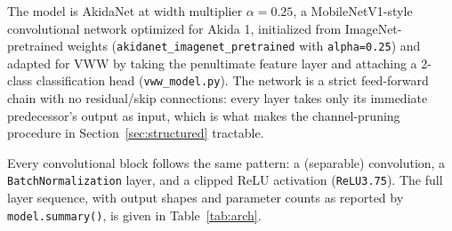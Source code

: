 \documentclass[11pt]{article}
\newcommand{\code}[1]{\texttt{#1}}
\begin{document}
The model is AkidaNet at width multiplier $\alpha=0.25$, a MobileNetV1-style convolutional network optimized for Akida 1, initialized from ImageNet-pretrained weights (\code{akidanet\_imagenet\_pretrained} with \code{alpha=0.25}) and adapted for VWW by taking the penultimate feature layer and attaching a 2-class classification head (\code{vww\_model.py}). The network is a strict feed-forward chain with no residual/skip connections: every layer takes only its immediate predecessor's output as input, which is what makes the channel-pruning procedure in Section~\ref{sec:structured} tractable.

Every convolutional block follows the same pattern: a (separable) convolution, a \code{BatchNormalization} layer, and a clipped ReLU activation (\code{ReLU3.75}). The full layer sequence, with output shapes and parameter counts as reported by \code{model.summary()}, is given in Table~\ref{tab:arch}.
\end{document}
